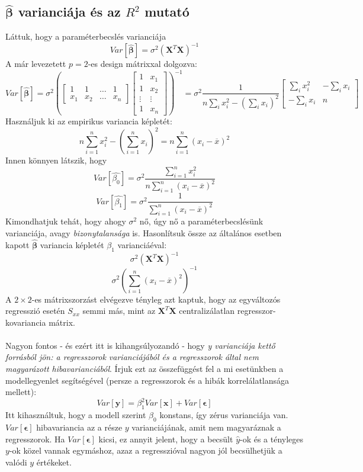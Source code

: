 \documentclass[14p]{report}
\def\pmb{\boldsymbol}
\def\ebeta{\hat{\pmb{\beta}}}
\def\e{\epsilon}
\def\bar{\overline}
\begin{document}
\subsection{$\ebeta$ varianciája és az $R^2$ mutató}
Láttuk, hogy a paraméterbecslés varianciája
\[
	Var[\ebeta] = \sigma^2(\pmb{X}^T\pmb{X})^{-1}
\]
A már levezetett $p=2$-es design mátrixxal dolgozva:
\[
	Var[\ebeta] = \sigma^2
	\left(\begin{bmatrix}
	1 & 1 & \dots & 1 \\
	x_1 & x_2 & \dots & x_n
	\end{bmatrix}
	\begin{bmatrix}
	1 & x_1 \\
	1 & x_2 \\
	\vdots & \vdots \\
	1 & x_n
	\end{bmatrix}\right)^{-1}
	=
	\sigma^2
	\frac{1}{n\sum_i{x_i^2} - (\sum_i{x_i})^2}
	\begin{bmatrix}
	\sum_i{x_i^2} & -\sum_i{x_i} \\
	-\sum_i{x_i} & n 
	\end{bmatrix}
\]
Használjuk ki az empirikus variancia képletét:
\[
	n\sum_{i=1}^{n}{x_i^2} - (\sum_{i=1}^{n}{x_i})^2 = n\sum_{i=1}^{n}{(x_i - \bar{x})^2}
\]
Innen könnyen látszik, hogy
\[
	Var[\hat{\beta_0}] = \sigma^2\frac{\sum_{i=1}^{n}{x_i^2}}{n\sum_{i=1}^{n}{(x_i - \bar{x})^2}}
\]
\[
	Var[\hat{\beta_1}] = \sigma^2\frac{1}{\sum_{i=1}^{n}{(x_i - \bar{x})^2}}
\]
Kimondhatjuk tehát, hogy ahogy $\sigma^2$ nő, úgy nő a paraméterbecslésünk varianciája, avagy \emph{bizonytalansága} is. Hasonlítsuk össze az általános esetben kapott $\ebeta$ variancia képletét $\beta_1$ varianciáéval:
\[
	\sigma^2(\pmb{X}^T\pmb{X})^{-1}
\]
\[
	\sigma^2(\sum_{i=1}^{n}{(x_i - \bar{x})^2})^{-1}
\]
A $2 \times 2$-es mátrixszorzást elvégezve tényleg azt kaptuk, hogy az egyváltozós regresszió esetén $S_{xx}$ semmi más, mint az $\pmb{X}^T\pmb{X}$ centralizálatlan regresszor-kovariancia mátrix.
\\
\\
Nagyon fontos - és ezért itt is kihangsúlyozandó - hogy \emph{y varianciája kettő forrásból jön: a regresszorok varianciájából és a regresszorok által nem magyarázott hibavarianciából}. Írjuk ezt az összefüggést fel a mi esetünkben a modellegyenlet segítségével (persze a regresszorok és a hibák korrelálatlansága mellett):
\[
	Var[\pmb{y}] = \beta_1^2Var[\pmb{x}] + Var[\pmb{\e}] 
\]
Itt kihasználtuk, hogy a modell szerint $\beta_0$ konstans, így zérus varianciája van. $Var[\pmb{\e}]$ hibavariancia az a része $y$ varianciájának, amit nem magyaráznak a regresszorok. Ha $Var[\pmb{\e}]$ kicsi, ez annyit jelent, hogy a becsült $\hat{y}$-ok és a tényleges $y$-ok közel vannak egymáshoz, azaz a regresszióval nagyon jól becsülhetjük a valódi $y$ értékeket.
\end{document}
